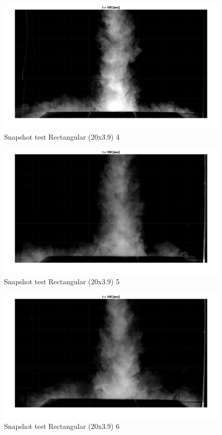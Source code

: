 \begin{figure}[ht!]
    \centering
    \includegraphics[width=\linewidth]{Images/Rec20_4_t100.jpg}
    \caption{Snapshot test Rectangular (20x3.9) 4}
\end{figure}

\begin{figure}[ht!]
    \centering
    \includegraphics[width=\linewidth]{Images/Rec20_5_t100.jpg}
    \caption{Snapshot test Rectangular (20x3.9) 5}
\end{figure}

\begin{figure}[ht!]
    \centering
    \includegraphics[width=\linewidth]{Images/Rec20_6_t100.jpg}
    \caption{Snapshot test Rectangular (20x3.9) 6}
\end{figure}

